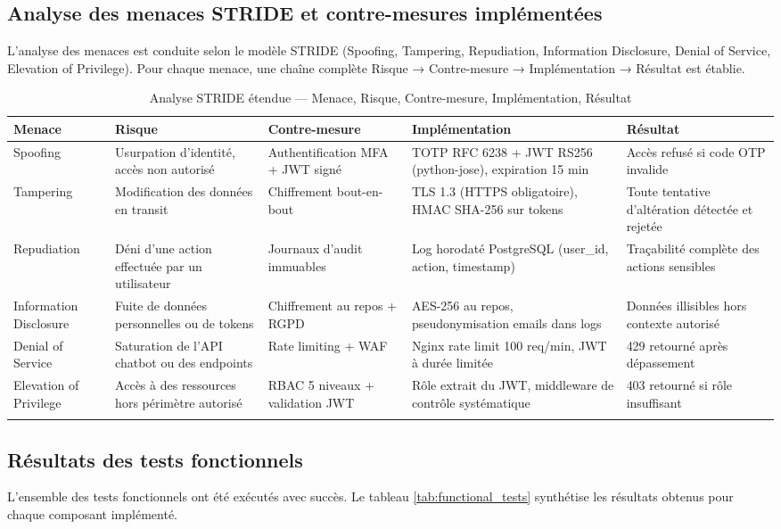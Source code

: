 \subsection{Analyse des menaces STRIDE et contre-mesures implémentées}
L'analyse des menaces est conduite selon le modèle STRIDE (Spoofing, Tampering, Repudiation, Information Disclosure, Denial of Service, Elevation of Privilege). Pour chaque menace, une chaîne complète Risque → Contre-mesure → Implémentation → Résultat est établie.

\begin{longtable}{|m{2.5cm}|m{2.5cm}|m{2.5cm}|m{3.5cm}|m{2cm}|}
\hline
\textbf{Menace} & \textbf{Risque} & \textbf{Contre-mesure} & \textbf{Implémentation} & \textbf{Résultat} \\
\hline
\endhead
\endfoot
\endlastfoot
\hline
Spoofing & Usurpation d'identité, accès non autorisé & Authentification MFA + JWT signé & TOTP RFC 6238 + JWT RS256 (python-jose), expiration 15 min & Accès refusé si code OTP invalide \\
\hline
Tampering & Modification des données en transit & Chiffrement bout-en-bout & TLS 1.3 (HTTPS obligatoire), HMAC SHA-256 sur tokens & Toute tentative d'altération détectée et rejetée \\
\hline
Repudiation & Déni d'une action effectuée par un utilisateur & Journaux d'audit immuables & Log horodaté PostgreSQL (user\_id, action, timestamp) & Traçabilité complète des actions sensibles \\
\hline
Information Disclosure & Fuite de données personnelles ou de tokens & Chiffrement au repos + RGPD & AES-256 au repos, pseudonymisation emails dans logs & Données illisibles hors contexte autorisé \\
\hline
Denial of Service & Saturation de l'API chatbot ou des endpoints & Rate limiting + WAF & Nginx rate limit 100 req/min, JWT à durée limitée & 429 retourné après dépassement \\
\hline
Elevation of Privilege & Accès à des ressources hors périmètre autorisé & RBAC 5 niveaux + validation JWT & Rôle extrait du JWT, middleware de contrôle systématique & 403 retourné si rôle insuffisant \\
\hline
\captionsetup{justification=centering,margin=2cm}
\caption{Analyse STRIDE étendue — Menace, Risque, Contre-mesure, Implémentation, Résultat}
\label{tab:stride_impl}
\end{longtable}

\subsection{Résultats des tests fonctionnels}
L'ensemble des tests fonctionnels ont été exécutés avec succès. Le tableau \ref{tab:functional_tests} synthétise les résultats obtenus pour chaque composant implémenté.

